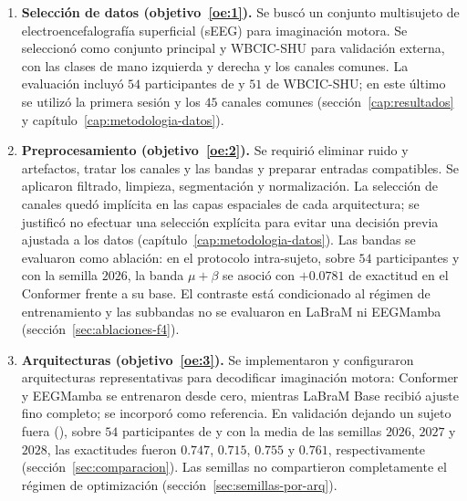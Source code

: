 \begin{enumerate}
  \item \textbf{Selección de datos (objetivo~\ref{oe:1}).} Se buscó un conjunto multisujeto
  de electroencefalografía superficial (sEEG) para imaginación motora. Se seleccionó
  \openbmi{} como conjunto principal y WBCIC-SHU para validación externa, con las clases
  de mano izquierda y derecha y los canales comunes. La evaluación incluyó $54$ participantes
  de \openbmi{} y $51$ de WBCIC-SHU; en este último se utilizó la primera sesión y los $45$
  canales comunes (sección~\ref{cap:resultados} y capítulo~\ref{cap:metodologia-datos}).

  \item \textbf{Preprocesamiento (objetivo~\ref{oe:2}).} Se requirió eliminar ruido y
  artefactos, tratar los canales y las bandas y preparar entradas compatibles. Se aplicaron
  filtrado, limpieza, segmentación y normalización. La selección de canales quedó implícita
  en las capas espaciales de cada arquitectura; se justificó no efectuar una selección explícita
  para evitar una decisión previa ajustada a los datos (capítulo~\ref{cap:metodologia-datos}).
  Las bandas se evaluaron como ablación: en el protocolo intra-sujeto, sobre $54$ participantes
  y con la semilla $2026$, la banda $\mu+\beta$ se asoció con $+0.0781$ de exactitud en el
  Conformer frente a su base. El contraste está condicionado al régimen de entrenamiento y
  las subbandas no se evaluaron en LaBraM ni EEGMamba
  (sección~\ref{sec:ablaciones-f4}).

  \item \textbf{Arquitecturas (objetivo~\ref{oe:3}).} Se implementaron y configuraron
  arquitecturas representativas para decodificar imaginación motora: Conformer y EEGMamba se
  entrenaron desde cero, mientras LaBraM Base recibió ajuste fino completo; \eegnet{} se
  incorporó como referencia. En validación dejando un sujeto fuera (\loso{}), sobre $54$
  participantes de \openbmi{} y con la media de las semillas $2026$, $2027$ y $2028$, las
  exactitudes fueron $0.747$, $0.715$, $0.755$ y $0.761$, respectivamente
  (sección~\ref{sec:comparacion}). Las semillas no compartieron completamente el régimen de
  optimización (sección~\ref{sec:semillas-por-arq}).


\end{enumerate}
